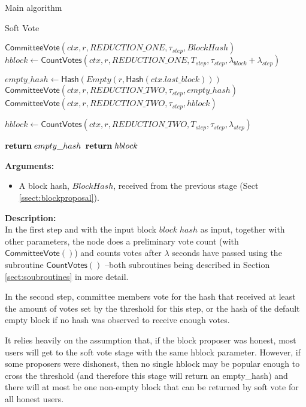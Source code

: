 \documentclass[10pt,a4paper]{article}
\begin{document}
\begin{section}{Main algorithm}
\begin{subsection}{Soft Vote}
\begin{algorithm}[H]
    \begin{algorithmic}[H]
    
    \State $\mathsf{CommitteeVote}(ctx, r, REDUCTION\_ONE, \tau_{step}, BlockHash)$
    \State $hblock \gets \mathsf{CountVotes}(ctx, r, REDUCTION\_ONE, T_{step}, \tau_{step}, \lambda_{block} + \lambda_{step})$

    \State $empty\_hash \gets \mathsf{Hash}(Empty(r, \mathsf{Hash}(ctx.last\_block)))$ 
        \State $\mathsf{CommitteeVote}(ctx, r, REDUCTION\_TWO, \tau_{step}, empty\_hash)$
    \Else
        {\State $\mathsf{CommitteeVote}(ctx, r, REDUCTION\_TWO, \tau_{step}, hblock)$}
    \EndIf\

    \State $hblock \gets \mathsf{CountVotes}(ctx, r, REDUCTION\_TWO, T_{step}, \tau_{step}, \lambda_{step})$ 

        {$\Return\; empty\_hash$}
        {$\Return\; hblock$}
    \EndFunction
    \end{algorithmic}
    \caption{\underline{Soft Vote}}
\end{algorithm}

\noindent \textbf{Arguments:}
\begin{itemize}
    \item A block hash, $BlockHash$, received from the previous stage (Sect \ref{ssect:blockproposal}).
  \end{itemize}

\noindent \textbf{Description:}\\
In the first step and with the input block $block\; hash$ as input, together
with other parameters, the node does a
preliminary vote count (with $\mathsf{CommitteeVote}()$) and counts votes 
after $\lambda$ seconds have passed using the subroutine $\mathsf{CountVotes}()$ --both 
subroutines being described in Section \ref{sect:soubroutines} in more detail.

In the second step, committee members vote for the hash that received at least the 
amount of votes set by the threshold for this step, or the hash of the default empty 
block if no hash was observed to receive enough votes.

It relies heavily on the assumption that, if the block proposer was honest, most users 
will get to the soft vote stage with the same hblock parameter.
However, if some proposers were dishonest, then no single hblock may be popular enough to 
cross the threshold (and therefore this stage will return an empty\_hash) and there 
will at most be one non-empty block that can be returned by soft vote 
for all honest users.


\end{subsection}
\end{section}
\end{document}

